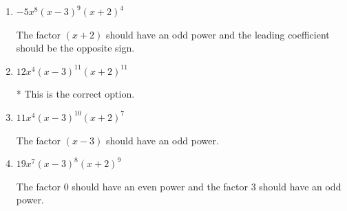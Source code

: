 \documentclass{extbook}[14pt]
\begin{document}
\begin{enumerate}
{\begin{enumerate}[label=\Alph*.]
This corresponds to the leading coefficient being the opposite value than it should be.
\item \( -5x^{8} (x - 3)^{9} (x + 2)^{4} \)

The factor $(x + 2)$ should have an odd power and the leading coefficient should be the opposite sign.
\item \( 12x^{4} (x - 3)^{11} (x + 2)^{11} \)

* This is the correct option.
\item \( 11x^{4} (x - 3)^{10} (x + 2)^{7} \)

The factor $(x - 3)$ should have an odd power.
\item \( 19x^{7} (x - 3)^{8} (x + 2)^{9} \)

The factor $0$ should have an even power and the factor $3$ should have an odd power.
\end{enumerate}

}
\end{enumerate}
\end{document}
